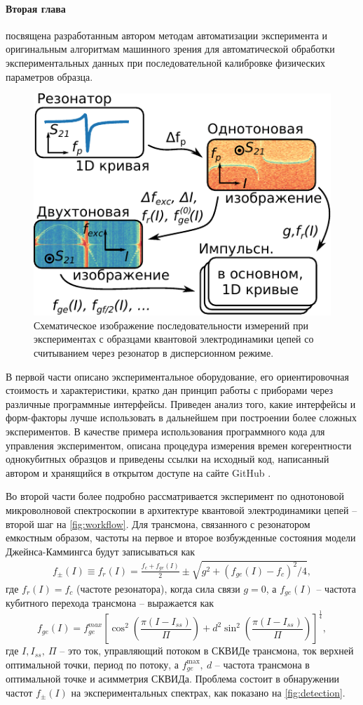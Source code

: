 \documentclass[14pt, a4paper]{extarticle}
\begin{document}
\paragraph{Вторая глава} посвящена разработанным автором методам автоматизации эксперимента и оригинальным алгоритмам машинного зрения для автоматической обработки экспериментальных данных при последовательной калибровке физических параметров образца. 


\begin{figure}
	\centering
	\includegraphics[width=0.5\linewidth]{Pictures/workflow}
	\caption{Схематическое изображение последовательности измерений при экспериментах с образцами квантовой электродинамики цепей со считыванием через резонатор в дисперсионном режиме.}
	\label{fig:workflow}
\end{figure}

В первой части описано экспериментальное оборудование, его ориентировочная стоимость и характеристики, кратко дан принцип работы с приборами через различные программные интерфейсы. Приведен анализ того, какие интерфейсы и форм-факторы лучше использовать в дальнейшем при построении более сложных экспериментов. В качестве примера использования программного кода для управления экспериментом, описана процедура измерения времен когерентности однокубитных образцов и приведены ссылки на исходный код, написанный автором и хранящийся в открытом доступе на сайте GitHub \cite{fedorov2021github}.


Во второй части более подробно рассматривается эксперимент по однотоновой микроволновой спектроскопии в архитектуре квантовой электродинамики цепей -- второй шаг на \autoref{fig:workflow}. Для трансмона, связанного с резонатором емкостным образом, частоты на первое и второе возбужденные состояния модели Джейнса-Каммингса будут записываться как 
\begin{align}
f_\pm(I) \equiv f_r(I) = \frac{f_c + f_{ge}(I)}{2} \pm \sqrt{g^2+(f_{ge}(I) - f_c)^2/4},\label{eq:f_r}
\end{align}
где $f_r(I) = f_c$ (частоте резонатора), когда сила связи $g=0$, а $f_{ge}(I)$ -- частота кубитного перехода трансмона -- выражается как
\begin{equation}
f_{ge}(I) = f_{ge}^{max} \left[\cos^2\left(\frac{\pi(I-I_{ss})}{\Pi}\right)+d^2 \sin^2 \left(\frac{\pi(I-I_{ss})}{\Pi}\right)\right]^\frac{1}{4},
\label{eq:tr_spectrum}
\end{equation}
где $I, I_{ss},\ \Pi$ -- это ток, управляющий потоком в СКВИДе трансмона, ток верхней оптимальной точки, период по потоку, а $f_{ge}^\text{max},\ d$ -- частота трансмона в оптимальной точке и асимметрия СКВИДа. Проблема состоит в обнаружении частот $f_{\pm}(I)$ на экспериментальных спектрах, как показано на \autoref{fig:detection}.
	
\end{document}
